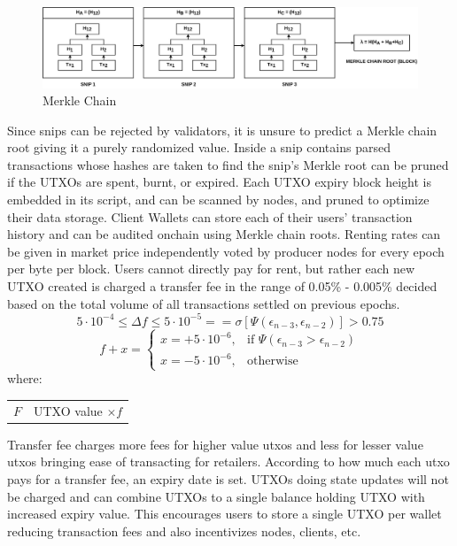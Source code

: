 \documentclass[a4paper,10pt]{article}
\makeatletter
\newenvironment{conditions}
  {\par\vspace{\abovedisplayskip}\noindent\begin{tabular}{>{$}l<{$} @{${}={}$} l}}
  {\end{tabular}\par\vspace{\belowdisplayskip}}
\makeatother
\begin{document}
\begin{figure}[h]
\begin{center}
\includegraphics[width=\textwidth]{merklechain}
\caption{Merkle Chain}
\end{center}
\end{figure}

\indent Since snips can be rejected by validators, it is unsure to predict a Merkle chain root giving it a purely randomized value. Inside a snip contains parsed transactions whose hashes are taken to find the snip's Merkle root can be pruned if the UTXOs are spent, burnt, or expired. Each UTXO expiry block height is embedded in its script, and can be scanned by nodes, and pruned to optimize their data storage. Client Wallets can store each of their users' transaction history and can be audited onchain using Merkle chain roots. Renting rates can be given in market price independently voted by producer nodes for every epoch per byte per block. Users cannot directly pay for rent, but rather each new UTXO created is charged a transfer fee in the range of 0.05\% - 0.005\% decided based on the total volume of all transactions settled on previous epochs.
\begin{equation}
5 \cdot 10^{-4} \leq \Delta f \leq 5 \cdot 10^{-5} == \sigma [\Psi (\epsilon_{n-3}, \epsilon_{n-2})] > 0.75
\end{equation}
\begin{equation}
f+x = \begin{cases}
x=+5 \cdot 10^{-6}, & \text{if } \Psi (\epsilon_{n-3} > \epsilon_{n-2})\\
x=-5 \cdot 10^{-6}, & \text{otherwise}
\end{cases}
\end{equation}
where:
\begin{conditions}
F & UTXO value $\times f$ 
\end{conditions}

 Transfer fee charges more fees for higher value utxos and less for lesser value utxos bringing ease of transacting for retailers. According to how much each utxo pays for a transfer fee, an expiry date is set. UTXOs doing state updates will not be charged and can combine UTXOs to a single balance holding UTXO with increased expiry value. This encourages users to store a single UTXO per wallet reducing transaction fees and also incentivizes nodes, clients, etc.  
\end{document}
